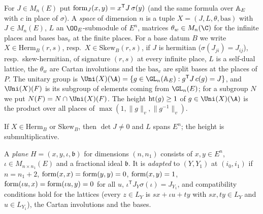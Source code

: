 \begin{definition}\label{pf:thmK-cone:def-spaces}
For $J\in M_n(E)$ put $\operatorname{form}_J(x,y)=x^{\mathsf T}J\,\sigma(y)$ (and the same formula over $\mathbb{A}_E$ with $c$ in
place of $\sigma$).  A \emph{space} of dimension $n$ is a tuple $X=(J,L,\theta,\mathrm{bas})$ with $J\in M_n(E)$, $L$ an
$\OO_E$-submodule of $E^n$, matrices $\theta_w\in M_n(\C)$ for the infinite places and bases $\mathrm{bas}_v$ at the
finite places.  For a base datum $B$ we write $X\in\mathrm{Herm}_B(r,s)$, resp.\ $X\in\mathrm{Skew}_B(r,s)$, if $J$ is
hermitian ($\sigma(J_{ji})=J_{ij}$), resp.\ skew-hermitian, of signature $(r,s)$ at every infinite place, $L$ is a
self-dual lattice, the $\theta_w$ are Cartan involutions and the $\mathrm{bas}_v$ are split bases at the places of $P$.
The unitary group is
$\Uni(X)(\A)=\{g\in\GL_n(\thmKconeAE):g^{\mathsf T}J\,c(g)=J\}$, and $\Uni(X)(F)$ is its subgroup of elements coming from
$\GL_n(E)$; for a subgroup $N$ we put $N(F)=N\cap\Uni(X)(F)$.  The height $\operatorname{ht}(g)\ge1$ of $g\in\Uni(X)(\A)$ is the
product over all places of $\max(1,\|g\|_v,\|g^{-1}\|_v)$.
\end{definition}

If $X\in\mathrm{Herm}_B$ or $\mathrm{Skew}_B$, then $\det J\neq0$ and $L$ spans $E^n$; the height is submultiplicative.

\begin{definition}[Planes]\label{pf:thmK-cone:def-plane}
A \emph{plane} $H=(x,y,\iota,\mathfrak b)$ for dimensions $(n,n_1)$ consists of $x,y\in E^n$, $\iota\in M_{n\times n_1}(E)$
and a fractional ideal $\mathfrak b$.  It is \emph{adapted} to $(Y,Y_1)$ at $(i_0,i_1)$ if $n=n_1+2$,
$\operatorname{form}(x,x)=\operatorname{form}(y,y)=0$, $\operatorname{form}(x,y)=1$, $\operatorname{form}(\iota u,x)=\operatorname{form}(\iota u,y)=0$ for
all $u$, $\iota^{\mathsf T}J_Y\sigma(\iota)=J_{Y_1}$, and compatibility conditions hold for the lattices (every $z\in L_Y$ is
$sx+\iota u+ty$ with $sx,ty\in L_Y$ and $u\in L_{Y_1}$), the Cartan involutions and the bases.
\end{definition}

